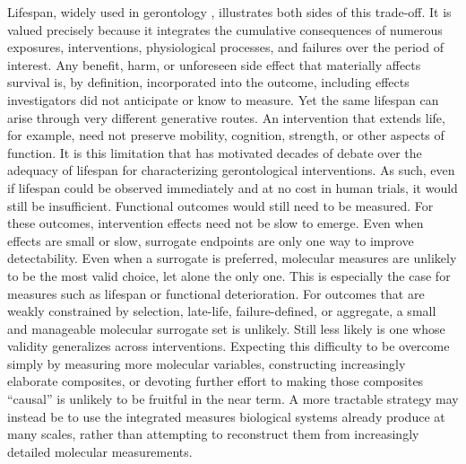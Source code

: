 \documentclass[twocolumn]{article} %
\begin{document}
Lifespan, widely used in gerontology \cite{stroustrup2018measuring}, illustrates both sides of this trade-off. It is valued precisely because it integrates the cumulative consequences of numerous exposures, interventions, physiological processes, and failures over the period of interest. Any benefit, harm, or unforeseen side effect that materially affects survival is, by definition, incorporated into the outcome, including effects investigators did not anticipate or know to measure. Yet the same lifespan can arise through very different generative routes. An intervention that extends life, for example, need not preserve mobility, cognition, strength, or other aspects of function. It is this limitation that has motivated decades of debate over the adequacy of lifespan for characterizing gerontological interventions. As such, even if lifespan could be observed immediately and at no cost in human trials, it would still be insufficient. Functional outcomes would still need to be measured. For these outcomes, intervention effects need not be slow to emerge. Even when effects are small or slow, surrogate endpoints are only one way to improve detectability. Even when a surrogate is preferred, molecular measures are unlikely to be the most valid choice, let alone the only one. This is especially the case for measures such as lifespan or functional deterioration. For outcomes that are weakly constrained by selection, late-life, failure-defined, or aggregate, a small and manageable molecular surrogate set is unlikely. Still less likely is one whose validity generalizes across interventions. Expecting this difficulty to be overcome simply by measuring more molecular variables, constructing increasingly elaborate composites, or devoting further effort to making those composites “causal” \cite{teschendorff2025epigenetic} is unlikely to be fruitful in the near term. A more tractable strategy may instead be to use the integrated measures biological systems already produce at many scales, rather than attempting to reconstruct them from increasingly detailed molecular measurements.
\end{document}
